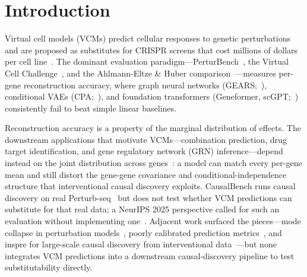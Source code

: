 \documentclass{article}
\theoremstyle{plain}
\theoremstyle{definition}
\theoremstyle{remark}
\begin{document}
\section{Introduction}
\label{sec:intro}

Virtual cell models (VCMs) predict cellular responses to genetic perturbations and are proposed as substitutes for CRISPR screens that cost millions of dollars per cell line~\citep{replogle2022,bunne2024}. The dominant evaluation paradigm---PerturBench~\citep{wu2024perturbench}, the Virtual Cell Challenge~\citep{roohani2025vcc}, and the Ahlmann-Eltze \& Huber comparison~\citep{ahlmanneltze2025}---measures per-gene reconstruction accuracy, where graph neural networks (GEARS;~\citealt{roohani2024gears}), conditional VAEs (CPA;~\citealt{lotfollahi2023cpa}), and foundation transformers (Geneformer, scGPT;~\citealt{theodoris2023geneformer,cui2024scgpt}) consistently fail to beat simple linear baselines.

Reconstruction accuracy is a property of the marginal distribution of effects. The downstream applications that motivate VCMs---combination prediction, drug target identification, and gene regulatory network (GRN) inference---depend instead on the joint distribution across genes~\citep{chevalley2025causalbench,vc_causal_2025}: a model can match every per-gene mean and still distort the gene-gene covariance and conditional-independence structure that interventional causal discovery exploits. CausalBench runs causal discovery on real Perturb-seq~\citep{chevalley2025causalbench} but does not test whether VCM predictions can substitute for that real data; a NeurIPS 2025 perspective called for such an evaluation without implementing one~\citep{vc_causal_2025}. Adjacent work surfaced the pieces---mode collapse in perturbation models~\citep{mejia2025diversity}, poorly calibrated prediction metrics~\citep{miller2025calibrated}, and inspre for large-scale causal discovery from interventional data~\citep{brown2025inspre}---but none integrates VCM predictions into a downstream causal-discovery pipeline to test substitutability directly.
\end{document}
